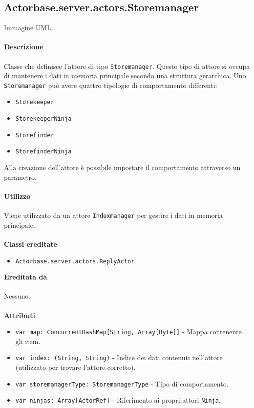 \documentclass[a4paper]{article}
\begin{document}
	\subsection{Actorbase.server.actors.Storemanager}
		Immagine UML.
		\\ \\
		\textbf{Descrizione}
			\\ \\
			Classe che definisce l'attore di tipo \texttt{Storemanager}. Questo tipo di attore si occupa di mantenere i dati in memoria principale secondo una struttura gerarchica. Uno \texttt{Storemanager} può avere quattro tipologie di comportamento differenti:
			\begin{itemize}
				\item \texttt{Storekeeper}
				\item \texttt{StorekeeperNinja}
				\item \texttt{Storefinder}
				\item \texttt{StorefinderNinja}
			\end{itemize}
		Alla creazione dell'attore è possibile impostare il comportamento attraverso un parametro. 
			\\ \\
		\textbf{Utilizzo}
			\\ \\
			Viene utilizzato da un attore \texttt{Indexmanager} per gestire i dati in memoria principale.
			\\ \\
		\textbf{Classi ereditate}
			\begin{itemize}
				\item \texttt{Actorbase.server.actors.ReplyActor}
			\end{itemize}
		\textbf{Ereditata da}
			\\ \\
			Nessuno.
			\\ \\
		\textbf{Attributi}
			\begin{itemize}
				\item \texttt{var map: ConcurrentHashMap[String,  Array[Byte]]} - Mappa contenente gli item. 
				\item \texttt{var index: (String, String)} - Indice dei dati contenuti nell'attore (utilizzato per trovare l'attore corretto).
				\item \texttt{var storemanagerType: StoremanagerType} - Tipo di comportamento.
				\item \texttt{var ninjas: Array[ActorRef]} - Riferimento ai propri attori \texttt{Ninja}.
			\end{itemize}
\end{document}
